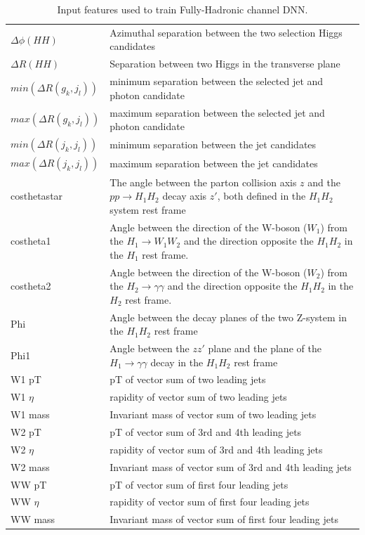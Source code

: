\begin{table}[!htbp]
{\begin{tabular}{|p{4cm}|p{12cm}|}
$\Delta \phi(HH)$ & Azimuthal separation between the two selection Higgs candidates\\
$\Delta R(HH)$ & Separation between two Higgs in the transverse plane\\
$min(\Delta R(g_k,j_l))$ & minimum separation between the selected jet and photon candidate\\
$max(\Delta R(g_k,j_l))$ & maximum separation between the selected jet and photon candidate\\
$min(\Delta R(j_k,j_l))$ & minimum separation between the jet candidates\\
$max(\Delta R(j_k,j_l))$ & maximum separation between the jet candidates\\
costhetastar & The angle between the parton collision axis $z$ and the $pp\rightarrow H_1H_{2}$ decay axis $z'$, both defined in the $H_1H_{2}$ system rest frame \\
costheta1 & Angle between the direction of the W-boson ($W_1$) from the $H_1\rightarrow W_1 W_2$ and the direction opposite the $H_1H_2$ in the $H_1$ rest frame.\\
costheta2 & Angle between the direction of the W-boson ($W_2$) from the $H_2\rightarrow \gamma \gamma$ and the direction opposite the $H_1H_2$ in the $H_2$ rest frame.\\
Phi & Angle between the decay planes of the two Z-system in the $H_1H_2$ rest frame\\
Phi1 & Angle between the $zz'$ plane and the plane of the $H_{1}\rightarrow \gamma \gamma$ decay in the $H_{1}H_{2}$ rest frame \\
W1 pT & pT of vector sum of two leading jets\\
W1 $\eta$ &  rapidity of vector sum of two leading jets\\
W1 mass &  Invariant mass of vector sum of two leading jets\\

W2 pT & pT of vector sum of 3rd and 4th leading jets\\
W2 $\eta$ & rapidity of vector sum of 3rd and 4th leading jets\\
W2 mass & Invariant mass of vector sum of 3rd and 4th leading jets\\

WW pT & pT of vector sum of first four leading jets\\
WW $\eta$ & rapidity of vector sum of first four leading jets\\
WW mass & Invariant mass of vector sum of first four leading jets\\
\hline
\end{tabular}
}

\caption{Input features used to train Fully-Hadronic channel DNN. \label{tab:FHDNNinputfeatures2}}
\end{table}

